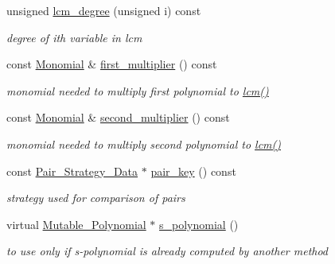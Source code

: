 \begin{Indent}
\begin{DoxyCompactItemize}
unsigned \hyperlink{class_critical___pair___basic_a4b9daf511d0ae94c24a5a0b8aa07588b}{lcm\+\_\+degree} (unsigned i) const
\begin{DoxyCompactList}\small\item\em degree of ith variable in lcm \end{DoxyCompactList}\item 
\mbox{\label{class_critical___pair___basic_a714e1ea76b993148dd55b05979b4b874}} 
const \hyperlink{class_monomial}{Monomial} \& \hyperlink{class_critical___pair___basic_a714e1ea76b993148dd55b05979b4b874}{first\+\_\+multiplier} () const
\begin{DoxyCompactList}\small\item\em monomial needed to multiply first polynomial to \hyperlink{class_critical___pair___basic_a336387d4ddd4f184399212599dbcb130}{lcm()} \end{DoxyCompactList}\item 
\mbox{\label{class_critical___pair___basic_abb08fb4bfc80732a92438cc6856503a1}} 
const \hyperlink{class_monomial}{Monomial} \& \hyperlink{class_critical___pair___basic_abb08fb4bfc80732a92438cc6856503a1}{second\+\_\+multiplier} () const
\begin{DoxyCompactList}\small\item\em monomial needed to multiply second polynomial to \hyperlink{class_critical___pair___basic_a336387d4ddd4f184399212599dbcb130}{lcm()} \end{DoxyCompactList}\item 
\mbox{\label{class_critical___pair___basic_a8fa18f909cc3b88af41a5796bd6c2424}} 
const \hyperlink{class_pair___strategy___data}{Pair\+\_\+\+Strategy\+\_\+\+Data} $\ast$ \hyperlink{class_critical___pair___basic_a8fa18f909cc3b88af41a5796bd6c2424}{pair\+\_\+key} () const
\begin{DoxyCompactList}\small\item\em strategy used for comparison of pairs \end{DoxyCompactList}\item 
virtual \hyperlink{class_mutable___polynomial}{Mutable\+\_\+\+Polynomial} $\ast$ \hyperlink{class_critical___pair___basic_ab2dbac89b07b2acfad633a9de8f56fab}{s\+\_\+polynomial} ()
\begin{DoxyCompactList}\small\item\em to use only if s-\/polynomial is already computed by another method \end{DoxyCompactList}\end{DoxyCompactItemize}
\end{Indent}
